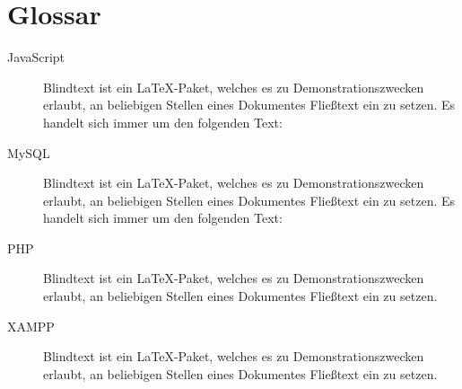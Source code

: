 

\chapter*{Glossar}

\begin{description}
\item [JavaScript] Blindtext ist ein \LaTeX-Paket, welches es zu Demonstrationszwecken erlaubt, an beliebigen Stellen eines Dokumentes Fließtext ein zu setzen. Es handelt sich immer um den folgenden Text:
	
\item [MySQL] Blindtext ist ein \LaTeX-Paket, welches es zu Demonstrationszwecken erlaubt, an beliebigen Stellen eines Dokumentes Fließtext ein zu setzen. Es handelt sich immer um den folgenden Text:

\item [PHP] Blindtext ist ein \LaTeX-Paket, welches es zu Demonstrationszwecken erlaubt, an beliebigen Stellen eines Dokumentes Fließtext ein zu setzen.


\item [XAMPP] Blindtext ist ein \LaTeX-Paket, welches es zu Demonstrationszwecken erlaubt, an beliebigen Stellen eines Dokumentes Fließtext ein zu setzen.

\end{description}